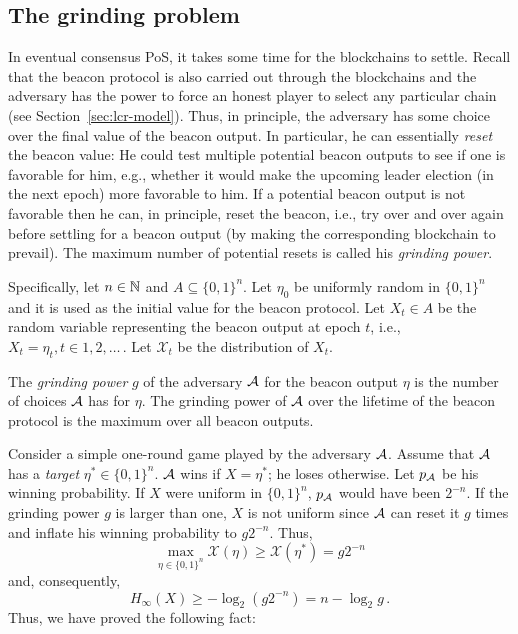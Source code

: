 \subsection{The grinding problem}
In eventual consensus PoS, 
it takes some time for the blockchains to settle. 
Recall that the beacon protocol is also carried out through the blockchains 
and the adversary has the power to force an honest player 
to select any particular chain (see Section~\ref{sec:lcr-model}).
Thus, in principle, 
the adversary has some choice over the final value of the beacon output.
In particular, he can essentially \emph{reset} the beacon value: 
He could test multiple potential beacon outputs to see if one is favorable for him, 
e.g., whether it would make the upcoming leader election (in the next epoch) 
more favorable to him. 
If a potential beacon output is not favorable then he can, in principle, reset the beacon, 
i.e., try over and over again before settling for a beacon output 
(by making the corresponding blockchain to prevail). 
The maximum number of potential resets is called his \emph{grinding power}.

Specifically, let $n \in \mathbb{N}$ and $A \subseteq \{0,1\}^n$.
Let $\eta_0$ be uniformly random in $\{0,1\}^n$ 
and it is used as the initial value for the beacon protocol. 
Let $X_t \in A$ be the random variable 
representing the beacon output at epoch $t$, 
i.e., $X_t = \eta_t, t \in 1, 2, \ldots$\,. 
Let $\mathcal{X}_t$ be the distribution of $X_t$. 

\begin{definition}\label{def:grinding-power-num-choices}
The \emph{grinding power} $g$ of the adversary $\mathcal{A}$ 
for the beacon output $\eta$
is the number of choices $\mathcal{A}$ has for $\eta$. 
The grinding power of $\mathcal{A}$ over 
the lifetime of the beacon protocol
is the maximum over all beacon outputs.
\end{definition}

Consider a simple one-round game played by the adversary $\mathcal{A}$. 
Assume that $\mathcal{A}$ has a \emph{target} $\eta^* \in \{0,1\}^n$. 
$\mathcal{A}$ wins if $X = \eta^*$; he loses otherwise. 
Let $p_{\mathcal{A}}$ be his winning probability. 
If $X$ were uniform in $\{0,1\}^n$, 
$p_{\mathcal{A}}$ would have been $2^{-n}$. 
If the grinding power $g$ is larger than one, 
$X$ is not uniform since 
$\mathcal{A}$ can reset it $g$ times 
and inflate his winning probability to $g 2^{-n}$. 
Thus, 
$$ 
    \max_{\eta \in \{0,1\}^n} \mathcal{X}(\eta) \geq \mathcal{X}(\eta^*) = g 2^{-n}
$$ 
and, consequently, 
$$
    H_\infty(X) \geq -\log_2 (g 2^{-n}) = n - \log_2 g
    \,.
$$
Thus, we have proved the following fact:

